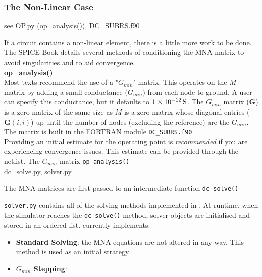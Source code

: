 \subsubsection{The Non-Linear Case}

see OP.py (op\_analysis()), DC\_SUBRS.f90

If a circuit contains a non-linear element, there is a little more work to be done. The SPICE Book \cite{vladimirescu1994spice} details several methods of conditioning the MNA matrix to avoid singularities and to aid convergence. \\
\textbf{op\_analysis()}\\
Most texts recommend the use of a "$G_{min}$" matrix. This operates on the $M$ matrix by adding a small conductance ($G_{min}$) from each node to ground. A user can specify this conductance, but it defaults to $\SI{1d-12}{\siemens}$. The $G_{min}$ matrix ($\mathbf{G}$) is a zero matrix of the same size as $M$ is a zero matrix whose diagonal entries ($\mathbf{G}\left( i, i\right)$) up until the number of nodes (excluding the reference) are the $G_{min}$. The matrix is built in the FORTRAN module \texttt{DC\_SUBRS.f90}.\\

Providing an initial estimate for the operating point is \textit{recommended} if you are experiencing convergence issues. This estimate can be provided through the netlist. The $G_{min}$ matrix \texttt{op\_analysis()}\\

dc\_solve.py, solver.py

The MNA matrices are first passed to an intermediate function \texttt{dc\_solve()}


\texttt{solver.py} contains all of the solving methods implemented in \turmeric. At runtime, when the simulator reaches the \texttt{dc\_solve()} method, solver objects are initialised and stored in an ordered list. \turmeric currently implements:
\begin{itemize}
    \item \textbf{Standard Solving}: the MNA equations are not altered in any way. This method is used as an initial strategy
    \item \textbf{$G_{min}$ Stepping}: 
\end{itemize}


